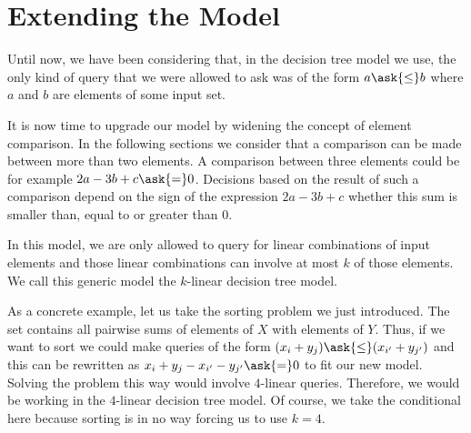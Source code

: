 \section{Extending the Model}

Until now, we have been considering that, in the decision tree
model we use, the only kind of query that we were allowed to ask was of the
form \(a \ask{\le} b \) where \(a\) and \(b\) are elements of some input set.

It is now time to upgrade our model by widening the concept of element
comparison. In the following sections we consider that a comparison can
be made between more than two elements. A comparison between three
elements could be for example \(2a - 3b + c \ask{=} 0\). Decisions based on the
result of such a comparison depend on the sign of the expression
\(2a - 3b + c\) \ie whether this sum is smaller than, equal to or greater than
\(0\).

In this model, we are only allowed to query for linear combinations of
input elements and those linear combinations can involve at most \(k\) of those
elements. We call this generic model the \(k\)-linear decision tree model.

As a concrete example, let us take the sorting \XY problem we just introduced.
The set \XY contains all pairwise sums of elements of \(X\) with elements of
\(Y\). Thus, if we want to sort \XY we could make queries of the form \((x_i +
y_j) \ask{\le} (x_{i'} + y_{j'})\) and this can be rewritten as \( x_i +
y_j - x_{i'} - y_{j'} \ask{=} 0\) to fit our new model. Solving the problem
this way would involve \(4\)-linear queries. Therefore, we would be working in
the \(4\)-linear decision tree model. Of course, we take the conditional here
because sorting \XY is in no way forcing us to use \(k=4\).

